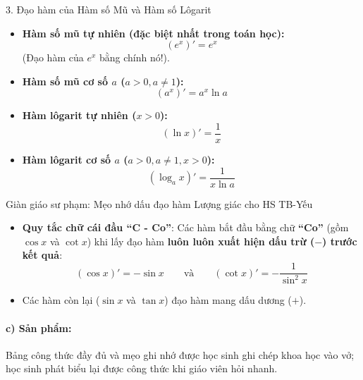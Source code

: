 \documentclass[12pt, a4paper]{article}
\begin{document}
\begin{pedabox}{3. Đạo hàm của Hàm số Mũ và Hàm số Lôgarit}
\begin{itemize}[leftmargin=0.5cm]
    \item \textbf{Hàm số mũ tự nhiên (đặc biệt nhất trong toán học):}
    \begin{equation}
        (e^x)' = e^x
    \end{equation}
    (Đạo hàm của $e^x$ bằng chính nó!).
    \item \textbf{Hàm số mũ cơ số $a$ ($a > 0, a \neq 1$):}
    \begin{equation}
        (a^x)' = a^x \ln a
    \end{equation}
    \item \textbf{Hàm lôgarit tự nhiên ($x > 0$):}
    \begin{equation}
        (\ln x)' = \dfrac{1}{x}
    \end{equation}
    \item \textbf{Hàm lôgarit cơ số $a$ ($a > 0, a \neq 1, x > 0$):}
    \begin{equation}
        (\log_a x)' = \dfrac{1}{x \ln a}
    \end{equation}
\end{itemize}
\end{pedabox}

\begin{scaffoldbox}{Giàn giáo sư phạm: Mẹo nhớ dấu đạo hàm Lượng giác cho HS TB-Yếu}
\begin{itemize}[leftmargin=0.5cm]
    \item \textbf{Quy tắc chữ cái đầu ``C - Co''}: Các hàm bắt đầu bằng chữ \textbf{``Co''} (gồm $\cos x$ và $\cot x$) khi lấy đạo hàm \textbf{luôn luôn xuất hiện dấu trừ ($-$) trước kết quả}:
    $$(\cos x)' = -\sin x \qquad \text{và} \qquad (\cot x)' = -\dfrac{1}{\sin^2 x}$$
    \item Các hàm còn lại ($\sin x$ và $\tan x$) đạo hàm mang dấu dương ($+$).
\end{itemize}
\end{scaffoldbox}

\paragraph{c) Sản phẩm:} Bảng công thức đầy đủ và mẹo ghi nhớ được học sinh ghi chép khoa học vào vở; học sinh phát biểu lại được công thức khi giáo viên hỏi nhanh.
\end{document}
